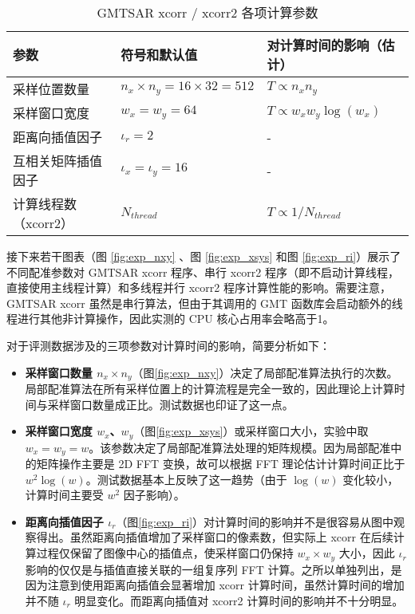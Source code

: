 \begin{table}[htbp]
\centering
\begin{tabular}{|l|l|l|}
    \hline
    \textbf{参数} & \textbf{符号和默认值} & \textbf{对计算时间的影响（估计）} \\
    \hline
    采样位置数量         & $ n_x \times n_y = 16 \times 32 = 512 $  & $ T \propto n_x n_y $                          \\
    \hline
    采样窗口宽度         & $ w_x = w_y = 64 $                       & $ T \propto w_x w_y \log(w_x) $                \\ 
    \hline
    距离向插值因子       & $ \iota_r = 2 $                          & -                                              \\
    \hline
    互相关矩阵插值因子   & $ \iota_x = \iota_y = 16 $               & -                                              \\ 
    \hline
    计算线程数（xcorr2） & $ N_{thread} $                           & $ T \propto 1 / N_{thread} $                   \\ 
    \hline
\end{tabular}
\caption{GMTSAR xcorr / xcorr2 各项计算参数} \label{tab:xcorr-args}
\end{table}
 
接下来若干图表（图 \ref{fig:exp_nxy} 、图 \ref{fig:exp_xsys} 和图 \ref{fig:exp_ri}）展示了不同配准参数对 GMTSAR xcorr 程序、串行 xcorr2 程序（即不启动计算线程，直接使用主线程计算）和多线程并行 xcorr2 程序计算性能的影响。需要注意，GMTSAR xcorr 虽然是串行算法，但由于其调用的 GMT 函数库会启动额外的线程进行其他非计算操作，因此实测的 CPU 核心占用率会略高于1。

对于评测数据涉及的三项参数对计算时间的影响，简要分析如下：

\begin{itemize}
    \item \textbf{采样窗口数量 $n_x \times n_y$}（图\ref{fig:exp_nxy}）决定了局部配准算法执行的次数。局部配准算法在所有采样位置上的计算流程是完全一致的，因此理论上计算时间与采样窗口数量成正比。测试数据也印证了这一点。
    \item \textbf{采样窗口宽度 $w_x$、$w_y$}（图\ref{fig:exp_xsys}）或采样窗口大小，实验中取 $w_x = w_y = w$。该参数决定了局部配准算法处理的矩阵规模。因为局部配准中的矩阵操作主要是 2D FFT 变换，故可以根据 FFT 理论估计计算时间正比于 $w^2 \log(w)$。测试数据基本上反映了这一趋势（由于 $\log(w)$ 变化较小，计算时间主要受 $w^2$ 因子影响）。
    \item \textbf{距离向插值因子 $\iota_r$}（图\ref{fig:exp_ri}）对计算时间的影响并不是很容易从图中观察得出。虽然距离向插值增加了采样窗口的像素数，但实际上 xcorr 在后续计算过程仅保留了图像中心的插值点，使采样窗口仍保持 $w_x \times w_y$ 大小，因此 $\iota_r$ 影响的仅仅是与插值直接关联的一组复序列 FFT 计算。之所以单独列出，是因为注意到使用距离向插值会显著增加 xcorr 计算时间，虽然计算时间的增加并不随 $\iota_r$ 明显变化。而距离向插值对 xcorr2 计算时间的影响并不十分明显。
\end{itemize}

